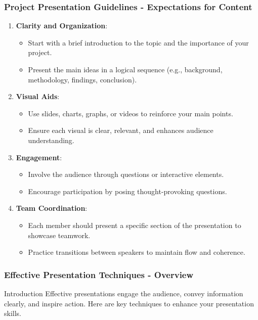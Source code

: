 \documentclass[aspectratio=169]{beamer}
\begin{document}
\begin{frame}[fragile]
    \frametitle{Project Presentation Guidelines - Expectations for Content}
    \begin{enumerate}
        \item \textbf{Clarity and Organization}:
            \begin{itemize}
                \item Start with a brief introduction to the topic and the importance of your project.
                \item Present the main ideas in a logical sequence (e.g., background, methodology, findings, conclusion).
            \end{itemize}
        \item \textbf{Visual Aids}:
            \begin{itemize}
                \item Use slides, charts, graphs, or videos to reinforce your main points.
                \item Ensure each visual is clear, relevant, and enhances audience understanding.
            \end{itemize}
        \item \textbf{Engagement}:
            \begin{itemize}
                \item Involve the audience through questions or interactive elements.
                \item Encourage participation by posing thought-provoking questions.
            \end{itemize}
        \item \textbf{Team Coordination}:
            \begin{itemize}
                \item Each member should present a specific section of the presentation to showcase teamwork.
                \item Practice transitions between speakers to maintain flow and coherence.
            \end{itemize}
    \end{enumerate}
\end{frame}

\begin{frame}[fragile]
    \frametitle{Effective Presentation Techniques - Overview}
    \begin{block}{Introduction}
        Effective presentations engage the audience, convey information clearly, and inspire action. Here are key techniques to enhance your presentation skills.
    \end{block}
\end{frame}
\end{document}
